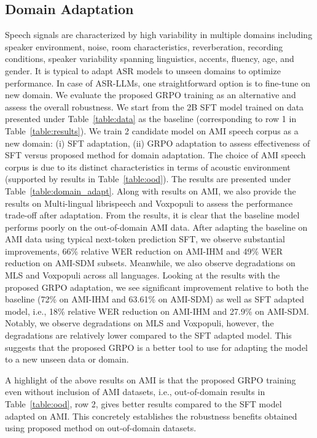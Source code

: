 \documentclass[conference]{IEEEtran}
\begin{document}
\subsection{Domain Adaptation}
Speech signals are characterized by high variability in multiple domains including speaker environment, noise, room characteristics, reverberation, recording conditions, speaker variability spanning linguistics, accents, fluency, age, and gender.
It is typical to adapt ASR models to unseen domains to optimize performance.
In case of ASR-LLMs, one straightforward option is to fine-tune on new domain.
We evaluate the proposed GRPO training as an alternative and assess the overall robustness.
We start from the 2B SFT model trained on data presented under Table~\ref{table:data} as the baseline (corresponding to row 1 in Table~\ref{table:results}).
We train 2 candidate model on AMI speech corpus as a new domain: (i) SFT adaptation, (ii) GRPO adaptation to assess effectiveness of SFT versus proposed method for domain adaptation.
The choice of AMI speech corpus is due to its distinct characteristics in terms of acoustic environment (supported by results in Table~\ref{table:ood}).
The results are presented under Table~\ref{table:domain_adapt}.
Along with results on AMI, we also provide the results on Multi-lingual librispeech and Voxpopuli to assess the performance trade-off after adaptation.
From the results, it is clear that the baseline model performs poorly on the out-of-domain AMI data.
After adapting the baseline on AMI data using typical next-token prediction SFT, we observe substantial improvements, 66\% relative WER reduction on AMI-IHM and 49\% WER reduction on AMI-SDM subsets.
Meanwhile, we also observe degradations on MLS and Voxpopuli across all languages.
Looking at the results with the proposed GRPO adaptation, we see significant improvement relative to both the baseline (72\% on AMI-IHM and 63.61\% on AMI-SDM) as well as SFT adapted model, i.e., 18\% relative WER reduction on AMI-IHM and 27.9\% on AMI-SDM.
Notably, we observe degradations on MLS and Voxpopuli, however, the degradations are relatively lower compared to the SFT adapted model.
This suggests that the proposed GRPO is a better tool to use for adapting the model to a new unseen data or domain.

A highlight of the above results on AMI is that the proposed GRPO training even without inclusion of AMI datasets, i.e., out-of-domain results in Table~\ref{table:ood}, row 2, gives better results compared to the SFT model adapted on AMI.
This concretely establishes the robustness benefits obtained using proposed method on out-of-domain datasets.
\end{document}
